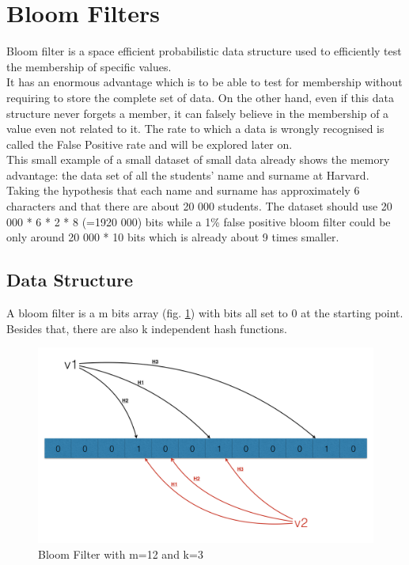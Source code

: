 \documentclass{eplmastersthesis}
\begin{document}
\section{Bloom Filters}
Bloom filter is a space efficient probabilistic data structure  used to efficiently test the membership of specific values.\\
It has an enormous advantage which is to be able to test for membership without requiring to store the complete set of data. On the other hand, even if this data structure never forgets a member, it can falsely believe in the membership of a value even not related to it. The rate to which a data is wrongly recognised is called the False Positive rate and will be explored later on.\\
This small example of a small dataset of small data already shows the memory advantage: the data set of all the students' name and surname at Harvard. Taking the hypothesis that each name and surname has approximately 6 characters and that there are about 20 000 students. The dataset should use 20 000 * 6 * 2 * 8 (=1920 000) bits while a 1\% false positive bloom filter could be only around 20 000 * 10 bits which is already about 9 times smaller.\\

\subsection{Data Structure}
A bloom filter is a m bits array (fig. \ref{bloom-1}) with bits all set to 0 at the starting point. Besides that, there are also k independent hash functions. 

\begin{figure}[h!]
	\begin{center}
		\includegraphics[scale=0.3]{res/bloom-1}
		\caption{Bloom Filter with m=12 and k=3}
		\label{bloom-1}
	\end{center}
\end{figure}
\end{document}

